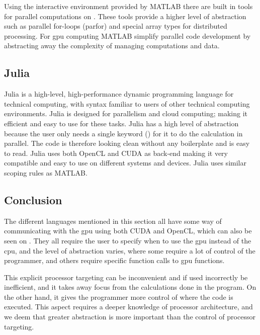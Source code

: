 Using the interactive environment provided by MATLAB there are built in tools for parallel computations on .
These tools provide a higher level of abstraction such as parallel for-loops (parfor) and special array types for distributed processing.
For \acrshort{gpu} computing MATLAB simplify parallel code development by abstracting away the complexity of managing computations and data.\citep{MATLAB_parallel}

\subsection{Julia}
Julia is a high-level, high-performance dynamic programming language for technical computing, with syntax familiar to users of other technical computing environments.
Julia is designed for parallelism and cloud computing; making it efficient and easy to use for these tasks.
Julia has a high level of abstraction because the user only needs a single keyword (\@parallel) for it to do the calculation in parallel.
The code is therefore looking clean without any boilerplate and is easy to read.
Julia uses both OpenCL and CUDA as back-end making it very compatible and easy to use on different systems and devices.
Julia uses similar scoping rules as MATLAB.\citep{Julia_Git, Julia_scope,Julia}

 

\subsection{Conclusion}  

The different languages mentioned in this section all have some way of communicating with the \acrshort{gpu} using both CUDA and OpenCL, which can also be seen on .
They all require the user to specify when to use the \acrshort{gpu} instead of the \acrshort{cpu}, and the level of abstraction varies, where some require a lot of control of the programmer, and others require specific function calls to \acrshort{gpu} functions.

This explicit processor targeting can be inconvenient and if used incorrectly be inefficient, and it takes away focus from the calculations done in the program.
On the other hand, it gives the programmer more control of where the code is executed.
This aspect requires a deeper knowledge of processor architecture, and we deem that greater abstraction is more important than the control of processor targeting.

